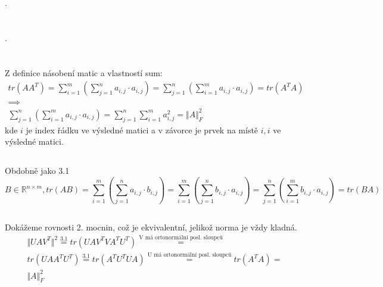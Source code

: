 \documentclass[12pt, a4paper]{article}
\begin{document}
\section{}
.

\section{}
.

\section{}
\subsection{}
Z definice násobení matic a vlastností sum:
\begin{gather*}
tr(AA^T) = \sum_{i=1}^{m}(\sum_{j=1}^{n} a_{i,j} \cdot a_{i,j}) = \sum_{j=1}^{n}(\sum_{i=1}^{m} a_{i,j} \cdot a_{i,j}) = tr(A^TA) \\
\implies \\
\sum_{j=1}^{n}(\sum_{i=1}^{m} a_{i,j} \cdot a_{i,j}) = \sum_{j=1}^{n}\sum_{i=1}^{m} a_{i,j}^2 = {\Vert A \Vert}_F^2
\end{gather*}
kde $i$ je index řádku ve výsledné matici a v závorce je prvek na místě $i,i$ ve výsledné matici.
\subsection{}
Obdobně jako 3.1
\[ B \in \mathbb{R}^{n \times m}, tr(AB)= \sum_{i=1}^{m}(\sum_{j=1}^{n} a_{i,j} \cdot b_{i,j}) = \sum_{i=1}^{m}(\sum_{j=1}^{n} b_{i,j} \cdot a_{i,j}) = \sum_{j=1}^{n}(\sum_{i=1}^{m} b_{i,j} \cdot a_{i,j}) = tr(BA)\]

\subsection{}
Dokážeme rovnosti 2. mocnin, což je ekvivalentní, jelikož norma je vždy kladná.
\begin{gather*}
\Vert UAV^T \Vert^2 \stackrel{\text{3.1}}{=} tr(UAV^{T}VA^{T}U^{T}) \stackrel{\text{V má ortonormální posl. sloupců}}{=} \\
tr(UAA^{T}U^{T}) \stackrel{\text{3.1}}{=} tr(A^{T}U^{T}UA) \stackrel{\text{U má ortonormální posl. sloupců}}{=} tr(A^TA) = \\
\Vert A \Vert_{F}^2
\end{gather*}
\end{document}
